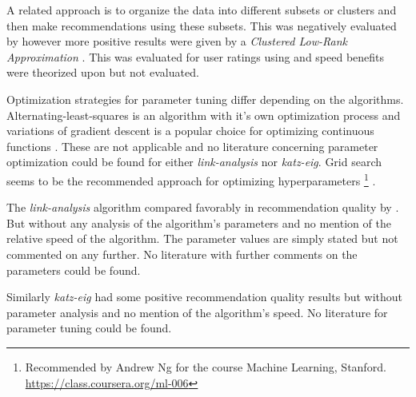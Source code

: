 A related approach is to organize the data into different subsets or clusters and then make recommendations using these subsets. This was negatively evaluated by \citep{cacheda2011comparison} however more positive results were given by a \textit{Clustered Low-Rank Approximation} \citep{niklas, savas2011clustered}.  This was evaluated for user ratings using \rmse and speed benefits were theorized upon but not evaluated.

Optimization strategies for parameter tuning differ depending on the algorithms. Alternating-least-squares is an algorithm with it's own optimization process and variations of gradient descent is a popular choice for optimizing continuous functions \citep{hu2008collaborative}. These are not applicable and no literature concerning parameter optimization could be found for either \textit{link-analysis} nor \textit{katz-eig}.  Grid search seems to be the recommended approach for optimizing hyperparameters
\footnote{Recommended by Andrew Ng for the course Machine Learning, Stanford. \url{https://class.coursera.org/ml-006}}
.

The \textit{link-analysis} algorithm compared favorably in recommendation quality by \citep{huang2007comparison}. But without any analysis of the algorithm's parameters and no mention of the relative speed of the algorithm. The parameter values are simply stated but not commented on any further. No literature with further comments on the parameters could be found.

Similarly \textit{katz-eig} had some positive recommendation quality results \citep{shin2012multi} but without parameter analysis and no mention of the algorithm's speed. No literature for parameter tuning could be found.

